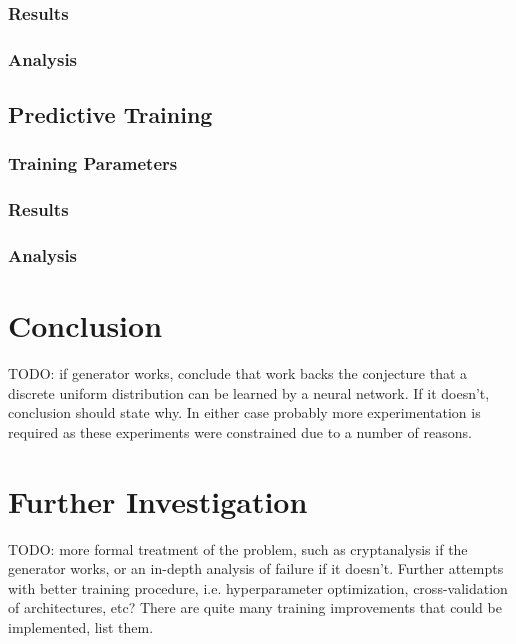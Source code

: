 \documentclass[12pt, titlepage]{report}
\theoremstyle{definition}
\begin{document}
\subsection{Results}
\subsection{Analysis}
\section{Predictive Training}
\subsection{Training Parameters}
\subsection{Results}
\subsection{Analysis}


\chapter{Conclusion}\label{chapter:conclusion}
TODO: if generator works, conclude that work backs the conjecture that a discrete uniform distribution can be learned by a neural network. If it doesn't, conclusion should state why. In either case probably more experimentation is required as these experiments were constrained due to a number of reasons.


\chapter{Further Investigation}
TODO: more formal treatment of the problem, such as cryptanalysis if the generator works, or an in-depth analysis of failure if it doesn't. Further attempts with better training procedure, i.e. hyperparameter optimization, cross-validation of architectures, etc? There are quite many training improvements that could be implemented, list them.




\end{document}
